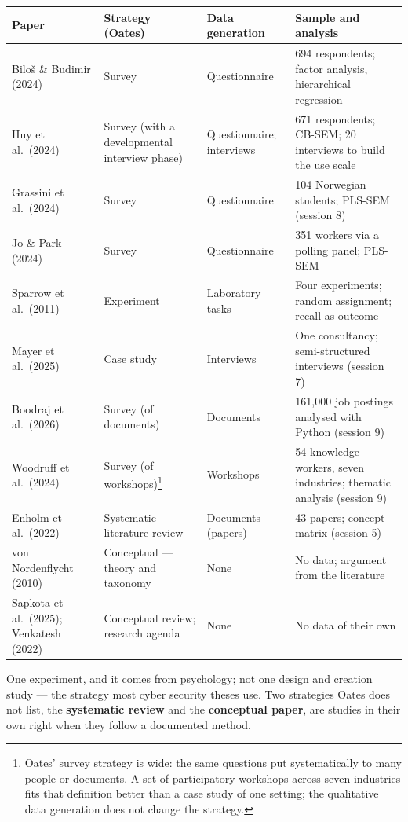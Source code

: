 \documentclass[11pt,a4paper,british,twoside=false,headings=small,chapterprefix=false,numbers=noenddot]{scrbook}
\begin{document}
\begin{center}\small
\scriptsize
  \renewcommand{\arraystretch}{1.15}
  \begin{tabular}{@{}p{3.2cm}p{2.6cm}p{2.6cm}p{4.9cm}@{}}
    \toprule
    \textbf{Paper} & \textbf{Strategy (Oates)} & \textbf{Data generation} & \textbf{Sample and analysis}\\
    \midrule
    Bilo\v{s} \& Budimir (2024) & Survey & Questionnaire & 694 respondents; factor analysis, hierarchical regression\\
    Huy et al.\ (2024) & Survey (with a developmental interview phase) & Questionnaire; interviews & 671 respondents; CB-SEM; 20 interviews to build the use scale\\
    Grassini et al.\ (2024) & Survey & Questionnaire & 104 Norwegian students; PLS-SEM (session 8)\\
    Jo \& Park (2024) & Survey & Questionnaire & 351 workers via a polling panel; PLS-SEM\\
    Sparrow et al.\ (2011) & Experiment & Laboratory tasks & Four experiments; random assignment; recall as outcome\\
    Mayer et al.\ (2025) & Case study & Interviews & One consultancy; semi-structured interviews (session 7)\\
    Boodraj et al.\ (2026) & Survey (of documents) & Documents & 161{,}000 job postings analysed with Python (session 9)\\
    Woodruff et al.\ (2024) & Survey (of workshops)\footnote{Oates' survey strategy is wide: the same questions put systematically to many people or documents. A set of participatory workshops across seven industries fits that definition better than a case study of one setting; the qualitative data generation does not change the strategy.} & Workshops & 54 knowledge workers, seven industries; thematic analysis (session 9)\\
    Enholm et al.\ (2022) & Systematic literature review & Documents (papers) & 43 papers; concept matrix (session 5)\\
    von Nordenflycht (2010) & Conceptual --- theory and taxonomy & None & No data; argument from the literature\\
    Sapkota et al.\ (2025); Venkatesh (2022) & Conceptual review; research agenda & None & No data of their own\\
    \bottomrule
  \end{tabular}
  

  \small One experiment, and it comes from psychology; not one design and
  creation study --- the strategy most cyber security theses use. Two
  strategies Oates does not list, the \textbf{systematic review} and the
  \textbf{conceptual paper}, are studies in their own right when they follow a
  documented method.
\end{center}
\end{document}
